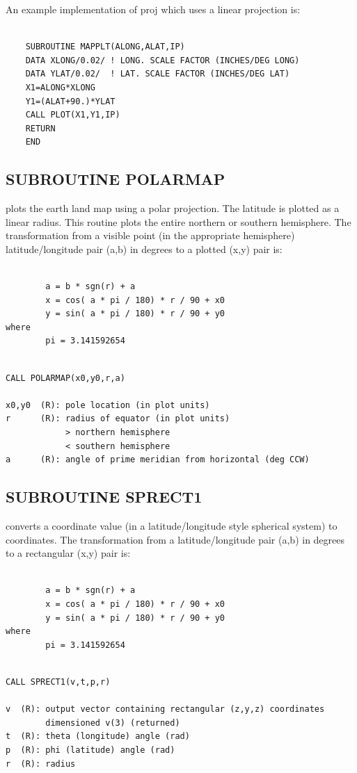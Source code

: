 \documentclass[11pt]{report}
\begin{document}
An example implementation of proj which uses a linear projection is:
\begin{verbatim}

	SUBROUTINE MAPPLT(ALONG,ALAT,IP)
	DATA XLONG/0.02/ ! LONG. SCALE FACTOR (INCHES/DEG LONG)
	DATA YLAT/0.02/	 ! LAT. SCALE FACTOR (INCHES/DEG LAT)
	X1=ALONG*XLONG
	Y1=(ALAT+90.)*YLAT
	CALL PLOT(X1,Y1,IP)
	RETURN
	END
\end{verbatim}

\subsection{SUBROUTINE POLARMAP}

 plots the earth land map using a polar projection.  The latitude
is plotted as a linear radius. This routine plots the entire
northern or southern hemisphere.  The transformation from a visible
point (in the appropriate hemisphere) latitude/longitude pair (a,b) in
degrees to a plotted (x,y) pair is:
\begin{verbatim}

        a = b * sgn(r) + a
        x = cos( a * pi / 180) * r / 90 + x0
        y = sin( a * pi / 180) * r / 90 + y0
where
        pi = 3.141592654
\end{verbatim}
\begin{verbatim}

CALL POLARMAP(x0,y0,r,a)

x0,y0  (R): pole location (in plot units)
r      (R): radius of equator (in plot units)
            > northern hemisphere
            < southern hemisphere
a      (R): angle of prime meridian from horizontal (deg CCW)
\end{verbatim}

\subsection{SUBROUTINE SPRECT1}

 converts a  coordinate value (in a latitude/longitude
style spherical system) to  coordinates.  The
transformation from a latitude/longitude pair (a,b) in degrees to a
rectangular (x,y) pair is:
\begin{verbatim}

        a = b * sgn(r) + a
        x = cos( a * pi / 180) * r / 90 + x0
        y = sin( a * pi / 180) * r / 90 + y0
where
        pi = 3.141592654
\end{verbatim}
\begin{verbatim}

CALL SPRECT1(v,t,p,r)

v  (R): output vector containing rectangular (z,y,z) coordinates
        dimensioned v(3) (returned)
t  (R): theta (longitude) angle (rad)
p  (R): phi (latitude) angle (rad)
r  (R): radius
\end{verbatim}
\end{document}
